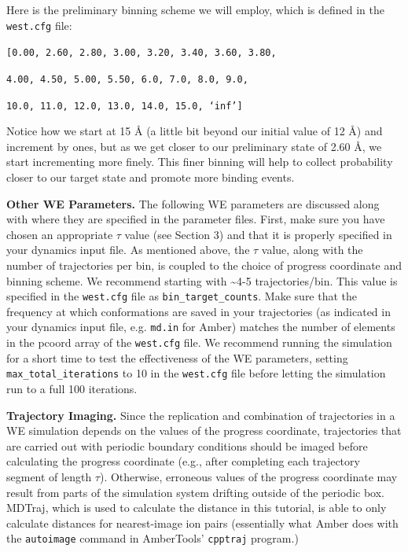 \documentclass[9pt,tutorial,pubversion]{livecoms}
\begin{document}
Here is the preliminary binning scheme we will employ, which is defined in the \verb|west.cfg| file:
 
\verb|[0.00, 2.60, 2.80, 3.00, 3.20, 3.40, 3.60, 3.80,|

\verb|4.00, 4.50, 5.00, 5.50, 6.0, 7.0, 8.0, 9.0,|

\verb|10.0, 11.0, 12.0, 13.0, 14.0, 15.0, ‘inf’]|
        	 
Notice how we start at 15 \AA{} (a little bit beyond our initial value of 12 \AA) and increment by ones, but as we get closer to our preliminary state of 2.60 \AA, we start incrementing more finely. 
This finer binning will help to collect probability closer to our target state and promote more binding events.

\textbf{Other WE Parameters.} The following WE parameters are discussed along with where they are specified in the parameter files. 
First, make sure you have chosen an  appropriate $\tau$ value (see Section 3) and that it is properly specified in your dynamics input file. 
As mentioned above, the $\tau$ value, along with the number of trajectories per bin, is coupled to the choice of progress coordinate and binning scheme. 
We recommend starting with \textasciitilde 4-5 trajectories/bin. 
This value is specified in the \verb|west.cfg| file as \verb|bin_target_counts|. 
Make sure that the frequency at which conformations are saved in your trajectories (as indicated in your dynamics input file, e.g. \verb|md.in| for Amber) matches the number of elements in the pcoord array of the \verb|west.cfg| file. 
We recommend running the simulation for a short time to test the effectiveness of the WE parameters, setting \verb|max_total_iterations| to 10 in the \verb|west.cfg| file before letting the simulation run to a full 100 iterations.  

\textbf{Trajectory Imaging.} Since the replication and combination of trajectories in a WE simulation depends on the values of the progress coordinate, trajectories that are carried out with periodic boundary conditions should be imaged before calculating the progress coordinate (e.g., after completing each trajectory segment of length $\tau$). 
Otherwise, erroneous values of the progress coordinate may result from parts of the simulation system drifting outside of the periodic box. 
MDTraj, which is used to calculate the distance in this tutorial, is able to only calculate distances for nearest-image ion pairs (essentially what Amber does with the \verb|autoimage| command in AmberTools’ \verb|cpptraj| program.)
\end{document}

